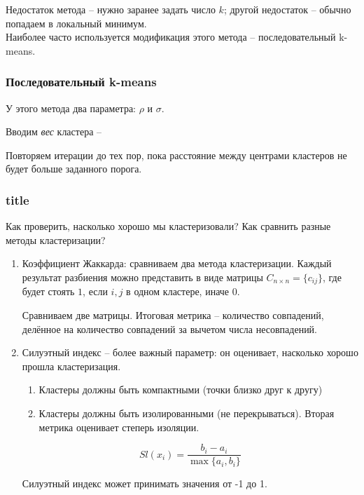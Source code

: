 \documentclass[main.tex]{subfiles}
\begin{document}
Недостаток метода -- нужно заранее задать число $k$; другой недостаток -- обычно попадаем в локальный минимум. \\

Наиболее часто используется модификация этого метода -- последовательный k-means.

\subsubsection{Последовательный k-means}

У этого метода два параметра: $ \rho $ и $ \sigma $.

Вводим \emph{вес} кластера -- 


Повторяем итерации до тех пор, пока расстояние между центрами кластеров не будет больше заданного порога.

\subsubsection{title}

Как проверить, насколько хорошо мы кластеризовали?
Как сравнить разные методы кластеризации?


\begin{enumerate}[noitemsep]
	\item Коэффициент Жаккарда: сравниваем два метода кластеризации.
	Каждый результат разбиения можно представить в виде матрицы $ C_{n \times n} = \{c_{ij}\} $, где будет стоять $ 1 $, если $ i,j $ в одном кластере, иначе $ 0 $.
	
	Сравниваем две матрицы.
	Итоговая метрика -- количество совпадений, делённое на количество совпадений за вычетом числа несовпадений.
	
	\item Силуэтный индекс -- более важный параметр: он оценивает, насколько хорошо прошла кластеризация.
	\begin{enumerate}[noitemsep]
		\item Кластеры должны быть компактными (точки близко друг к другу)
		\item Кластеры должны быть изолированными (не перекрываться). Вторая метрика оценивает степерь изоляции.
	\end{enumerate}
	
	$$ Sl(x_i) = \frac{b_i-a_i}{\max\{a_i,b_i\}} $$

	Силуэтный индекс может принимать значения от -1 до 1.
\end{enumerate}
\end{document}
